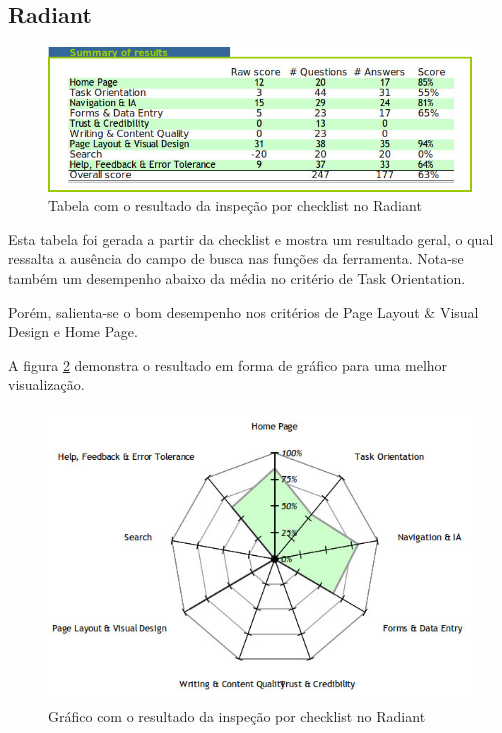 \subsection{Radiant}


\begin{figure}[here]
\includegraphics[width=130mm]{images/radiant_result_checklist_table.jpg}
\caption{Tabela com o resultado da inspeção por checklist no Radiant}
\label{fig:resultado_checklist_radiant_tabela}
\end{figure}

Esta tabela foi gerada a partir da checklist e mostra um resultado geral, o qual ressalta a ausência do campo de busca nas funções da ferramenta. Nota-se também um desempenho abaixo da média no critério de Task Orientation.

Porém, salienta-se o bom desempenho nos critérios de Page Layout \& Visual Design e Home Page.


A figura \ref{fig:resultado_checklist_radiant_grafico} demonstra o resultado em forma de gráfico para uma melhor visualização.

\begin{figure}[here]
\includegraphics[scale=0.5]{images/radiant_result_checklist_graph.jpg}
\caption{Gráfico com o resultado da inspeção por checklist no Radiant}
\label{fig:resultado_checklist_radiant_grafico}
\end{figure}

